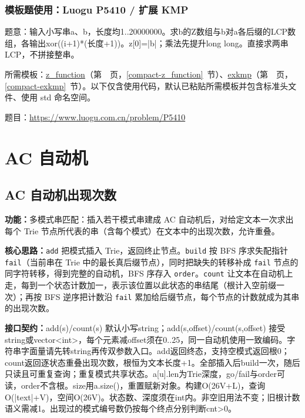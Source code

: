 

\Needspace{329pt}

\subsection*{模板题使用：Luogu P5410 / 扩展 KMP}

\label{usage-example-250}

题意：输入小写串a、b，长度均1..20000000。求b的Z数组与b对a各后缀的LCP数组，各输出xor((i+1)*(长度+1))。z[0]=|b|；乘法先提升long long。直接求两串LCP，不拼接整串。

所需模板：\hyperref[compact-z_function]{z\_\allowbreak{}function}（第~\pageref{compact-z_function}~页，\ref{compact-z_function}~节）、\hyperref[compact-exkmp]{exkmp}（第~\pageref{compact-exkmp}~页，\ref{compact-exkmp}~节）。以下仅含使用代码，默认已粘贴所需模板并包含标准头文件、使用 std 命名空间。

题目：\url{https://www.luogu.com.cn/problem/P5410}



\Needspace{180pt}

\chapter{AC 自动机}

\section{AC 自动机出现次数}\label{compact-AhoCorasick}

\noindent\textbf{功能：}\allowbreak 多模式串匹配：插入若干模式串建成 AC 自动机后，对给定文本一次求出每个 Trie 节点所代表的串（含每个模式）在文本中的出现次数，允许重叠。

\textbf{核心思路：}\allowbreak \texttt{add} 把模式插入 Trie，返回终止节点。\texttt{build} 按 BFS 序求失配指针 \texttt{fail}（当前串在 Trie 中的最长真后缀节点），同时把缺失的转移补成 \texttt{fail} 节点的同字符转移，得到完整的自动机，BFS 序存入 \texttt{order}。\texttt{count} 让文本在自动机上走，每到一个状态计数加一，表示该位置以此状态的串结尾（根计入空前缀一次）；再按 BFS 逆序把计数沿 \texttt{fail} 累加给后缀节点，每个节点的计数就成为其串的出现次数。



{\sloppy{}\noindent\textbf{接口契约：}add(s)/count(s) 默认小写string；add(s,offset)/count(s,offset) 接受string或vector<int>，每个元素减offset须在0..25，同一自动机使用一致编码。字符串字面量请先转string再传双参数入口。add返回终态，支持空模式返回根0；count返回逐状态重叠出现次数，根恒为文本长度+1。全部插入后build一次，随后只读且可重复查询；重复模式共享状态。a[u].len为Trie深度，go/fail与order可读，order不含根。size用a.size()，重置赋新对象。构建O(26V+L)，查询O(|text|+V)，空间O(26V)。状态数、深度须在int内。非空旧用法不变；旧根计数语义需减1。出现过的模式编号数仍按每个终点分别判断cnt>0。\par}

